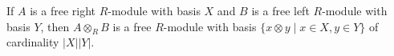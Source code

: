 If $A$ is a free right $R$-module with basis $X$ and $B$ is a free left $R$-module with basis $Y$, then $A \otimes_R B$ is a free $R$-module with basis $\{x \otimes y \mid x \in X, y \in Y\}$ of cardinality $|X||Y|$.
